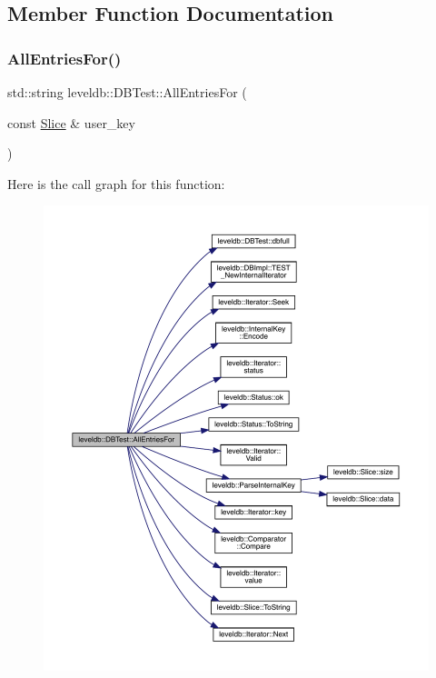 \subsection{Member Function Documentation}
\mbox{\label{classleveldb_1_1_d_b_test_adaf171601eaaf2cd24edaa394752f733}} 
\subsubsection{\texorpdfstring{AllEntriesFor()}{AllEntriesFor()}}
{\footnotesize\ttfamily std\+::string leveldb\+::\+D\+B\+Test\+::\+All\+Entries\+For (\begin{DoxyParamCaption}\item[{const \mbox{\hyperlink{classleveldb_1_1_slice}{Slice}} \&}]{user\+\_\+key }\end{DoxyParamCaption})\hspace{0.3cm}{\ttfamily [inline]}}

Here is the call graph for this function\+:
\nopagebreak
\begin{figure}[H]
\begin{center}
\leavevmode
\includegraphics[width=350pt]{classleveldb_1_1_d_b_test_adaf171601eaaf2cd24edaa394752f733_cgraph}
\end{center}
\end{figure}
\mbox{\label{classleveldb_1_1_d_b_test_a587534fe403016f15cf1997ef7a40836}} 
